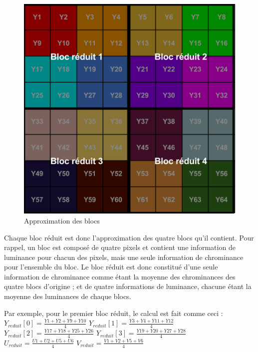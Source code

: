 \documentclass[11pt,a4paper]{article}
\begin{document}
\begin{figure}[H]
\begin{center}
\includegraphics[scale=0.5]{images/yuv3.png}
\end{center}
\caption{Approximation des blocs}
\label{}
\end{figure}

\bigbreak

Chaque bloc réduit est donc l'approximation des quatre blocs qu'il contient.
Pour rappel, un bloc est composé de quatre pixels et contient une information de luminance pour chacun des pixels, mais une seule information de chrominance pour l'ensemble du bloc.
Le bloc réduit est donc constitué d'une seule information de chrominance comme étant la moyenne des chrominances des quatre blocs d'origine ; et de quatre informations de luminance, chacune étant la moyenne des luminances de chaque blocs.

\bigbreak
Par exemple, pour le premier bloc réduit, le calcul est fait comme ceci :
\medbreak
$Y_{reduit}[0] = \frac{Y1 + Y2 + Y9 + Y10}{4}$
\medbreak
$Y_{reduit}[1] = \frac{Y3 + Y4 + Y11 + Y12}{4}$
\medbreak
$Y_{reduit}[2] = \frac{Y17 + Y18 + Y25 + Y26}{4}$
\medbreak
$Y_{reduit}[3] = \frac{Y19 + Y20 + Y27 + Y28}{4}$
\medbreak
$U_{reduit} = \frac{U1 + U2 + U5 + U6}{4}$
\medbreak
$V_{reduit} = \frac{V1 + V2 + V5 + V6}{4}$

\bigbreak
\end{document}
